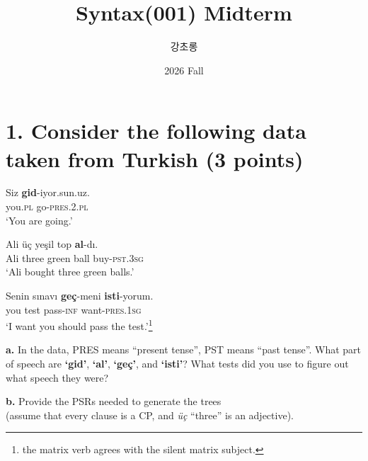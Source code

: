 \documentclass{article}
\newcommand{\glabbr}[1]{\textsc{\MakeLowercase{#1}}}
\begin{document}
\large

\title{Syntax(001) Midterm}
\author{강초롱}
\date{2026 Fall}
\maketitle
\thispagestyle{fancy}
\bigskip

\section{1. Consider the following data taken from Turkish \normalsize(3 points)}
\medskip 
\begin{exe}
  \ex
  \gll Siz \textbf{gid}-iyor.sun.uz.\\
       you.\glabbr{PL} go-\glabbr{PRES}.2.\glabbr{PL}\\
  \glt `You are going.'

  \ex
  \gll Ali \"{u}\c{c} ye\c{s}il top \textbf{al}-d\i.\\
       Ali three green ball buy-\glabbr{PST}.3\glabbr{SG}\\
  \glt `Ali bought three green balls.'

  \ex
  \gll Senin s\i{}nav\i{} \textbf{ge\c{c}}-meni
       \textbf{isti}-yorum.\\
       you test pass-\glabbr{INF} want-\glabbr{PRES}.1\glabbr{SG}\\
  \glt `I want you should pass the test.'\footnote{the matrix verb agrees with the silent matrix subject.}
\end{exe}
\bigskip
\noindent \textbf{a.} In the data, PRES means ``present tense'', PST means ``past tense''. 
What part of speech are \textbf{`gid'}, \textbf{`al'}, \textbf{`ge\c{c}'}, and \textbf{`isti'}? 
What tests did you use to figure out what speech they were? \par
\vspace{2cm}

\noindent \textbf{b.} Provide the PSRs needed to generate the trees \\(assume that every clause is a CP, and \textit{\"{u}\c{c}} ``three'' is an adjective). \par
\vspace{3cm}

\newpage
\end{document}
